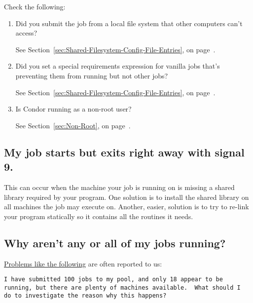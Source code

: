 Check the following:
\begin {enumerate}

\item{Did you submit the job from a local file system that other
computers can't access?}

See Section~\ref{sec:Shared-Filesystem-Config-File-Entries}, on
page~\pageref{sec:Shared-Filesystem-Config-File-Entries}.

\item{Did you set a special requirements expression for 
vanilla jobs that's preventing them from running but not other jobs?}

See Section~\ref{sec:Shared-Filesystem-Config-File-Entries}, on
page~\pageref{sec:Shared-Filesystem-Config-File-Entries}.

\item{Is Condor running as a non-root user?}

See Section~\ref{sec:Non-Root}, on page~\pageref{sec:Non-Root}.

\end{enumerate}

\subsection*{My job starts but exits right away with signal 9.}


This can occur when the machine your job is running on is missing a
shared library required by your program.
One solution is to install the shared library on all machines the job
may execute on.
Another, easier, solution is to try to re-link your program statically
so it contains all the routines it needs.


\subsection*{Why aren't any or all of my jobs running?}

\underline{Problems like the following} are often reported to us:

\footnotesize
\begin{verbatim}
I have submitted 100 jobs to my pool, and only 18 appear to be
running, but there are plenty of machines available.  What should I
do to investigate the reason why this happens?
\end{verbatim}
\normalsize

